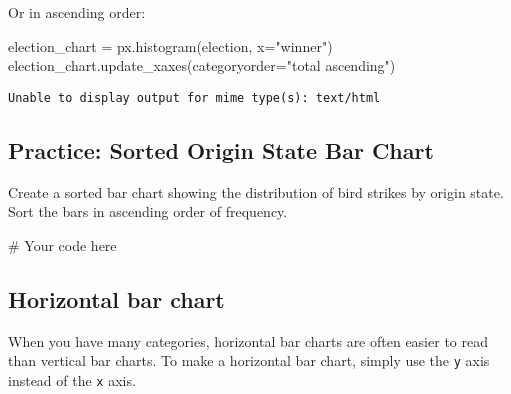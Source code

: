 \documentclass[
  letterpaper,
  DIV=11,
  numbers=noendperiod]{scrreprt}
\newenvironment{Shaded}{\begin{snugshade}}{\end{snugshade}}
\newcommand{\CommentTok}[1]{\textcolor[rgb]{0.37,0.37,0.37}{#1}}
\newcommand{\NormalTok}[1]{\textcolor[rgb]{0.00,0.23,0.31}{#1}}
\newcommand{\OperatorTok}[1]{\textcolor[rgb]{0.37,0.37,0.37}{#1}}
\newcommand{\StringTok}[1]{\textcolor[rgb]{0.13,0.47,0.30}{#1}}
\begin{document}
Or in ascending order:

\begin{Shaded}
\begin{Highlighting}[]
\NormalTok{election\_chart }\OperatorTok{=}\NormalTok{ px.histogram(election, x}\OperatorTok{=}\StringTok{"winner"}\NormalTok{)}
\NormalTok{election\_chart.update\_xaxes(categoryorder}\OperatorTok{=}\StringTok{"total ascending"}\NormalTok{)}
\end{Highlighting}
\end{Shaded}

\begin{verbatim}
Unable to display output for mime type(s): text/html
\end{verbatim}

\begin{tcolorbox}[enhanced jigsaw, colframe=quarto-callout-tip-color-frame, opacityback=0, titlerule=0mm, bottomrule=.15mm, breakable, leftrule=.75mm, colbacktitle=quarto-callout-tip-color!10!white, title=\textcolor{quarto-callout-tip-color}{\faLightbulb}\hspace{0.5em}{Practice}, rightrule=.15mm, coltitle=black, opacitybacktitle=0.6, colback=white, left=2mm, arc=.35mm, toptitle=1mm, bottomtitle=1mm, toprule=.15mm]

\subsection{Practice: Sorted Origin State Bar
Chart}\label{practice-sorted-origin-state-bar-chart}

Create a sorted bar chart showing the distribution of bird strikes by
origin state. Sort the bars in ascending order of frequency.

\begin{Shaded}
\begin{Highlighting}[]
\CommentTok{\# Your code here}
\end{Highlighting}
\end{Shaded}

\end{tcolorbox}

\subsection{Horizontal bar chart}\label{horizontal-bar-chart}

When you have many categories, horizontal bar charts are often easier to
read than vertical bar charts. To make a horizontal bar chart, simply
use the \texttt{y} axis instead of the \texttt{x} axis.
\end{document}
